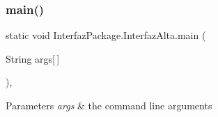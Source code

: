\subsubsection{\texorpdfstring{main()}{main()}}
{\footnotesize\ttfamily static void Interfaz\+Package.\+Interfaz\+Alta.\+main (\begin{DoxyParamCaption}\item[{String}]{args\mbox{[}$\,$\mbox{]} }\end{DoxyParamCaption})\hspace{0.3cm}{\ttfamily [inline]}, {\ttfamily [static]}}


\begin{DoxyParams}{Parameters}
{\em args} & the command line arguments \\
\hline
\end{DoxyParams}

